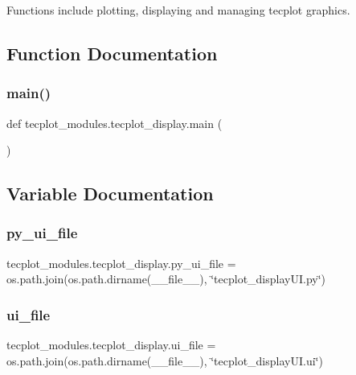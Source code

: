Functions include plotting, displaying and managing tecplot graphics. 

\subsection{Function Documentation}
\hypertarget{a00063_ae84aaefe646aaa295bfdc9a3046a660f}{}\label{a00063_ae84aaefe646aaa295bfdc9a3046a660f} 
\subsubsection{\texorpdfstring{main()}{main()}}
{\footnotesize\ttfamily def tecplot\+\_\+modules.\+tecplot\+\_\+display.\+main (\begin{DoxyParamCaption}{ }\end{DoxyParamCaption})}



\subsection{Variable Documentation}
\hypertarget{a00063_a4ac8bfff686ecfec8b20653a09a9acc3}{}\label{a00063_a4ac8bfff686ecfec8b20653a09a9acc3} 
\subsubsection{\texorpdfstring{py\+\_\+ui\+\_\+file}{py\_ui\_file}}
{\footnotesize\ttfamily tecplot\+\_\+modules.\+tecplot\+\_\+display.\+py\+\_\+ui\+\_\+file = os.\+path.\+join(os.\+path.\+dirname(\+\_\+\+\_\+file\+\_\+\+\_\+), \char`\"{}tecplot\+\_\+display\+U\+I.\+py\char`\"{})}

\hypertarget{a00063_a6eb7c910a295eb89ac32ad8b00d5bd2e}{}\label{a00063_a6eb7c910a295eb89ac32ad8b00d5bd2e} 
\subsubsection{\texorpdfstring{ui\+\_\+file}{ui\_file}}
{\footnotesize\ttfamily tecplot\+\_\+modules.\+tecplot\+\_\+display.\+ui\+\_\+file = os.\+path.\+join(os.\+path.\+dirname(\+\_\+\+\_\+file\+\_\+\+\_\+), \char`\"{}tecplot\+\_\+display\+U\+I.\+ui\char`\"{})}

